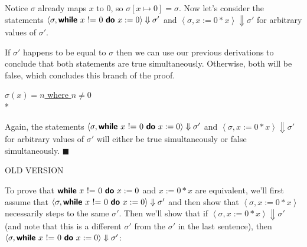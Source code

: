 \documentclass[11pt]{article}
\begin{document}
\begin{exercise}
\begin{enumerate}
Notice $\sigma$ already maps $x$ to 0, so $\sigma[x \mapsto 0] = \sigma$. Now let's consider the statements  $\left< \sigma, \while{x~\mathord{!}\mathord{=}~0}{x := 0} \right> \Downarrow \sigma'$ and $\left< \sigma, x:= 0 * x \right> \Downarrow \sigma'$ for arbitrary values of $\sigma'$. 

If $\sigma'$ happens to be equal to $\sigma$ then we can use our previous derivations to conclude that both statements are true simultaneously. Otherwise, both will be false, which concludes this branch of the proof.

\underline{$\sigma(x) = n$ where $n \neq 0$} \\*

\footnotesize 
\begin{prooftree}
\end{prooftree}
\normalsize

\begin{prooftree}
\end{prooftree}

Again, the statements $\left< \sigma, \while{x~\mathord{!}\mathord{=}~0}{x := 0} \right> \Downarrow \sigma'$ and $\left< \sigma, x:= 0 * x \right> \Downarrow \sigma'$ for arbitrary values of $\sigma'$ will either be true simultaneously or false simultaneously. $\blacksquare$


\newpage
OLD VERSION

To prove that $\while{x~\mathord{!}\mathord{=}~0}{x := 0}$ and $x:= 0 * x$ are equivalent, we'll first assume that $\left< \sigma, \while{x~\mathord{!}\mathord{=}~0}{x := 0} \right> \Downarrow \sigma'$ and then show that $\left< \sigma, x:=0*x \right>$ necessarily steps to the same $\sigma'$. Then we'll show that if $\left< \sigma, x:= 0 * x \right> \Downarrow \sigma'$ (and note that this is a different $\sigma'$ from the $\sigma'$ in the last sentence), then $\left< \sigma, \while{x~\mathord{!}\mathord{=}~0}{x := 0} \right> \Downarrow \sigma'$:


\end{enumerate}
\end{exercise}
\end{document}
